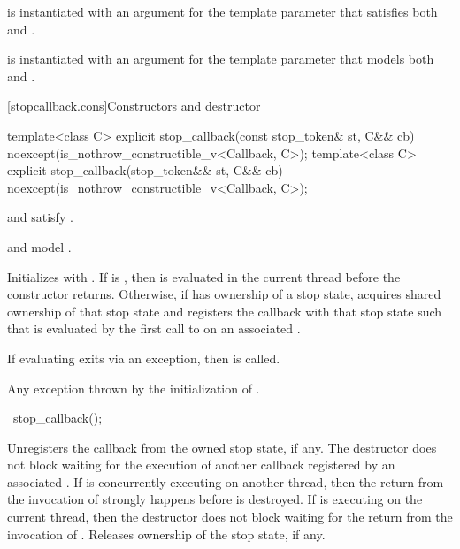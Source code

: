 \pnum
\mandates
{} is instantiated with an argument for the
template parameter 
that satisfies both 
and .

\pnum
\expects
{} is instantiated with an argument for the
template parameter 
that models both 
and .


[stopcallback.cons]{Constructors and destructor}

%
\begin{itemdecl}
template<class C>
explicit stop_callback(const stop_token& st, C&& cb)
  noexcept(is_nothrow_constructible_v<Callback, C>);
template<class C>
explicit stop_callback(stop_token&& st, C&& cb)
  noexcept(is_nothrow_constructible_v<Callback, C>);
\end{itemdecl}
\begin{itemdescr}
\pnum
\constraints
{} and  satisfy .

\pnum
\expects
{} and  model .

\pnum
\effects
Initializes  with .
If  is , then
is evaluated in the current thread before the constructor returns.
Otherwise, if  has ownership of a stop state,
acquires shared ownership of that stop state and registers
the callback with that stop state
such that 
is evaluated by the first call to 
on an associated .

\pnum
\remarks
If evaluating
exits via an exception,
then  is called.

\pnum
\throws Any exception thrown by the initialization of .
\end{itemdescr}

%
\begin{itemdecl}
~stop_callback();
\end{itemdecl}

\begin{itemdescr}
\pnum
\effects
Unregisters the callback from the owned stop state, if any.
The destructor does not block waiting for the execution of another callback
registered by an associated .
If  is concurrently executing on another thread,
then the return from the invocation of 
strongly happens before
 is destroyed.
If  is executing on the current thread,
then the destructor does not block waiting for
the return from the invocation of .
Releases ownership of the stop state, if any.
\end{itemdescr}


